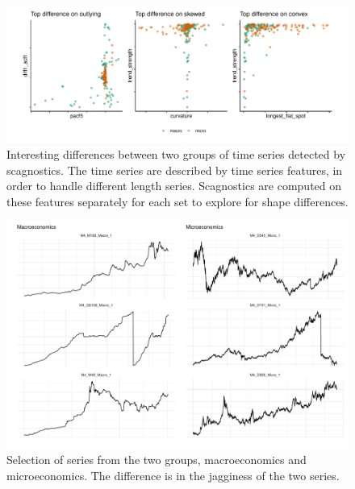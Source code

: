 \begin{Schunk}
\begin{figure}
\includegraphics[width=1\linewidth]{mason-lee-laa-cook_files/figure-latex/timeseries-1} \caption[Interesting differences between two groups of time series detected by scagnostics]{Interesting differences between two groups of time series detected by scagnostics. The time series are described by time series features, in order to handle different length series. Scagnostics are computed on these features separately for each set to explore for shape differences.}\label{fig:timeseries}
\end{figure}
\end{Schunk}

\begin{Schunk}
\begin{figure}
\includegraphics[width=1\linewidth]{mason-lee-laa-cook_files/figure-latex/tsplots-1} \caption[Selection of series from the two groups, macroeconomics and microeconomics]{Selection of series from the two groups, macroeconomics and microeconomics. The difference is in the jagginess of the two series.}\label{fig:tsplots}
\end{figure}
\end{Schunk}

